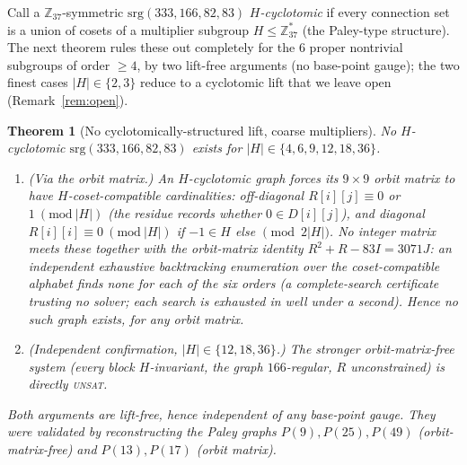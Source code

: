 \documentclass[11pt]{article}
\newtheorem{theorem}{Theorem}
\theoremstyle{definition}
\newcommand{\Z}{\mathbb{Z}}
\begin{document}
Call a $\Z_{37}$-symmetric $\mathrm{srg}(333,166,82,83)$ \emph{$H$-cyclotomic} if every connection set is a
union of cosets of a multiplier subgroup $H\le\Z_{37}^\ast$ (the Paley-type structure). The next theorem
rules these out completely for the $6$ proper nontrivial subgroups of order $\ge 4$, by two lift-free
arguments (no base-point gauge); the two finest cases $|H|\in\{2,3\}$ reduce to a cyclotomic lift that we
leave open (Remark~\ref{rem:open}).

\begin{theorem}[No cyclotomically-structured lift, coarse multipliers]\label{thm:cyclo}
No $H$-cyclotomic $\mathrm{srg}(333,166,82,83)$ exists for $|H|\in\{4,6,9,12,18,36\}$.
\begin{enumerate}[label=(\alph*),leftmargin=2em]
\item \emph{(Via the orbit matrix.)} An $H$-cyclotomic graph forces its $9\times9$ orbit matrix to have
$H$-coset-compatible cardinalities: off-diagonal $R[i][j]\equiv 0$ or $1\ (\mathrm{mod}\ |H|)$ (the residue
records whether $0\in D[i][j]$), and diagonal $R[i][i]\equiv 0\ (\mathrm{mod}\ |H|)$ if $-1\in H$ else
$\pmod{2|H|}$. No integer matrix meets these together with the orbit-matrix identity $R^2+R-83I=3071J$:
an independent exhaustive backtracking enumeration over the coset-compatible alphabet finds \emph{none} for
each of the six orders (a complete-search certificate trusting no solver; each search is exhausted in well
under a second). Hence no such graph exists, for \emph{any} orbit matrix.
\item \emph{(Independent confirmation, $|H|\in\{12,18,36\}$.)} The stronger orbit-matrix-free system (every
block $H$-invariant, the graph $166$-regular, $R$ unconstrained) is directly \textsc{unsat}.
\end{enumerate}
Both arguments are lift-free, hence independent of any base-point gauge. They were validated by
reconstructing the Paley graphs $P(9),P(25),P(49)$ (orbit-matrix-free) and $P(13),P(17)$ (orbit matrix).
\end{theorem}
\end{document}
